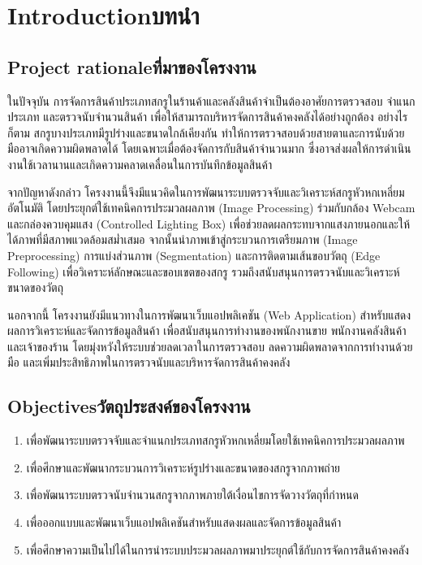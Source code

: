 \chapter{\ifenglish Introduction\else บทนำ\fi}

\section{\ifenglish Project rationale\else ที่มาของโครงงาน\fi}

ในปัจจุบัน การจัดการสินค้าประเภทสกรูในร้านค้าและคลังสินค้าจำเป็นต้องอาศัยการตรวจสอบ จำแนกประเภท และตรวจนับจำนวนสินค้า เพื่อให้สามารถบริหารจัดการสินค้าคงคลังได้อย่างถูกต้อง อย่างไรก็ตาม สกรูบางประเภทมีรูปร่างและขนาดใกล้เคียงกัน ทำให้การตรวจสอบด้วยสายตาและการนับด้วยมืออาจเกิดความผิดพลาดได้ โดยเฉพาะเมื่อต้องจัดการกับสินค้าจำนวนมาก ซึ่งอาจส่งผลให้การดำเนินงานใช้เวลานานและเกิดความคลาดเคลื่อนในการบันทึกข้อมูลสินค้า

จากปัญหาดังกล่าว โครงงานนี้จึงมีแนวคิดในการพัฒนาระบบตรวจจับและวิเคราะห์สกรูหัวหกเหลี่ยมอัตโนมัติ โดยประยุกต์ใช้เทคนิคการประมวลผลภาพ (Image Processing) \cite{dia2024} ร่วมกับกล้อง Webcam และกล่องควบคุมแสง (Controlled Lighting Box) เพื่อช่วยลดผลกระทบจากแสงภายนอกและให้ได้ภาพที่มีสภาพแวดล้อมสม่ำเสมอ จากนั้นนำภาพเข้าสู่กระบวนการเตรียมภาพ (Image Preprocessing) การแบ่งส่วนภาพ (Segmentation) และการติดตามเส้นขอบวัตถุ (Edge Following) เพื่อวิเคราะห์ลักษณะและขอบเขตของสกรู รวมถึงสนับสนุนการตรวจนับและวิเคราะห์ขนาดของวัตถุ

นอกจากนี้ โครงงานยังมีแนวทางในการพัฒนาเว็บแอปพลิเคชัน (Web Application) สำหรับแสดงผลการวิเคราะห์และจัดการข้อมูลสินค้า เพื่อสนับสนุนการทำงานของพนักงานขาย พนักงานคลังสินค้า และเจ้าของร้าน โดยมุ่งหวังให้ระบบช่วยลดเวลาในการตรวจสอบ ลดความผิดพลาดจากการทำงานด้วยมือ และเพิ่มประสิทธิภาพในการตรวจนับและบริหารจัดการสินค้าคงคลัง

\section{\ifenglish Objectives\else วัตถุประสงค์ของโครงงาน\fi}

\begin{enumerate}                                        
    \item เพื่อพัฒนาระบบตรวจจับและจำแนกประเภทสกรูหัวหกเหลี่ยมโดยใช้เทคนิคการประมวลผลภาพ
    \item เพื่อศึกษาและพัฒนากระบวนการวิเคราะห์รูปร่างและขนาดของสกรูจากภาพถ่าย
    \item เพื่อพัฒนาระบบตรวจนับจำนวนสกรูจากภาพภายใต้เงื่อนไขการจัดวางวัตถุที่กำหนด
    \item เพื่อออกแบบและพัฒนาเว็บแอปพลิเคชันสำหรับแสดงผลและจัดการข้อมูลสินค้า
    \item เพื่อศึกษาความเป็นไปได้ในการนำระบบประมวลผลภาพมาประยุกต์ใช้กับการจัดการสินค้าคงคลัง
\end{enumerate}

